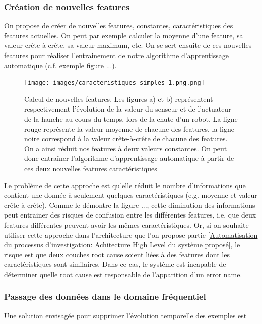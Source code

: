 \subsubsection{Création de nouvelles features}
\label{Automatisation du processus d'investigation: Reconnaissance de motifs: Différentes approches étudiées: Création de nouvelles features}
On propose de créer de nouvelles features, constantes, caractéristiques des features actuelles. On peut par exemple calculer la moyenne d'une feature, sa valeur crête-à-crête, sa valeur maximum, etc. On se sert ensuite de ces nouvelles features pour réaliser l'entrainement de notre algorithme d'apprentissage automatique (c.f. exemple figure ...).

\begin{figure}[h]
	\centering\texttt{[image: images/caracteristiques\_simples\_1.png.png]}
	\caption[Calcul de nouvelles features]{Calcul de nouvelles features. Les figures a) et b) représentent respectivement l'évolution de la valeur du senseur et de l'actuateur de la hanche au cours du temps, lors de la chute d'un robot. La ligne rouge représente la valeur moyenne de chacune des features. la ligne noire correspond à la valeur crête-à-crête de chacune des features. On a ainsi réduit nos features à deux valeurs constantes. On peut donc entraîner l'algorithme d'apprentissage automatique à partir de ces deux nouvelles features caractéristiques}
	\label{fig:Synoptique d'une couche root cause}
\end{figure}


Le problème de cette approche est qu'elle réduit le nombre d'informations que contient une donnée à seulement quelques caractéristiques (e.g. moyenne et valeur crête-à-crête). Comme le démontre la figure ..., cette diminution des informations peut entrainer des risques de confusion entre les différentes features, i.e. que deux features différentes peuvent avoir les mêmes caractéristiques. Or, si on souhaite utiliser cette approche dans l'architecture que l'on propose partie \ref{Automatisation du processus d'investigation: Achitecture High Level du système proposé}, le risque est que deux couches root cause soient liées à des features dont les caractéristiques sont similaires. Dans ce cas, le système est incapable de déterminer quelle root cause est responsable de l'apparition d'un error name.

\subsubsection{Passage des données dans le domaine fréquentiel}
\label{Automatisation du processus d'investigation: Reconnaissance de motifs: Différentes approches étudiées: Passage des données dans le domaine fréquentiel}
Une solution envisagée pour supprimer l'évolution temporelle des exemples est 

